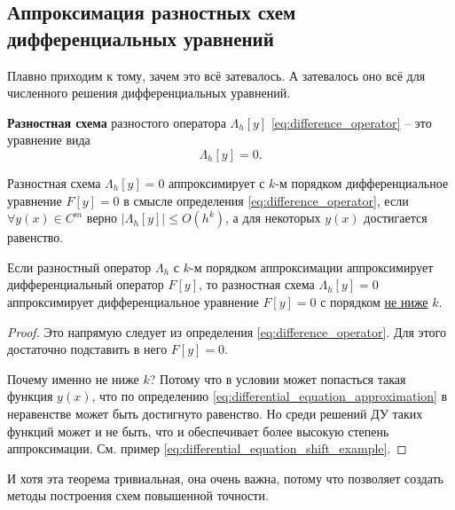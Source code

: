 \documentclass[../main.tex]{subfile}
\begin{document}
\subsection{Аппроксимация разностных схем дифференциальных уравнений}
Плавно приходим к тому, зачем это всё затевалось. А затевалось оно всё для
численного решения дифференциальных уравнений.

\begin{define}\label{eq:difference_scheme}
	\textbf{Разностная схема} разностого оператора $\Lambda_h[y]$
	\eqref{eq:difference_operator} -- это уравнение вида
	\[\Lambda_h[y]=0.\]
\end{define}

\begin{define}\label{eq:differential_equation_approximation}
	Разностная схема $\Lambda_h[y]=0$ аппроксимирует с $k$-м порядком
	дифференциальное уравнение $F[y]=0$ в смысле определения
	\eqref{eq:difference_operator}, если $\forall y(x)\in C^m$ верно
	$\big|\Lambda_h[y]\big|\le O(h^k)$, а для некоторых $y(x)$ достигается
	равенство.
\end{define}

\begin{theorem}[тривиальная]
	Если разностный оператор $\Lambda_h$ с $k$-м порядком аппроксимации
	аппроксимирует дифференциальный оператор $F[y]$, то разностная схема
	$\Lambda_h[y]=0$ аппроксимирует дифференциальное уравнение $F[y]=0$
	с порядком \underline{не ниже} $k$.
\end{theorem}

\begin{proof}
	Это напрямую следует из определения \eqref{eq:difference_operator}.
	Для этого достаточно подставить в него $F[y]=0$.

	Почему именно не ниже $k$? Потому что в условии может попасться
	такая функция $y(x)$, что по определению
	\eqref{eq:differential_equation_approximation} в неравенстве может быть
	достигнуто равенство. Но среди решений ДУ таких функций может и не быть,
	что и обеспечивает более высокую степень аппроксимации. См. пример
	\eqref{eq:differential_equation_shift_example}.
\end{proof}

И хотя эта теорема тривиальная, она очень важна, потому что позволяет создать
методы построения схем повышенной точности.
\end{document}
